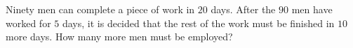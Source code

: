 Ninety men can complete a piece of work in $20$ days. After the $90$ men have worked for $5$ days, it is decided that the rest of the work must be finished in $10$ more days. How many more men must be employed?
